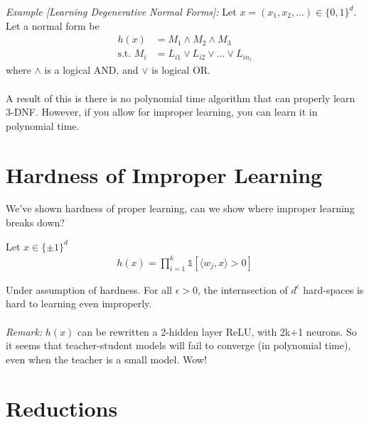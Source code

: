 \begin{sidework}
	\emph{Example [Learning Degenerative Normal Forms]:} Let $x = (x_1, x_2, ...) \in \{0, 1\}^d$. Let a normal form be
\begin{align}
	h(x) & = M_1 \wedge M_2 \wedge M_3\\
	\text{s.t. } M_i & = L_{i1} \vee L_{i2} \vee ... \vee L_{i n_i}
\end{align}
where $\wedge$ is a logical AND, and $\vee$ is logical OR.\\
\\
A result of this is there is no polynomial time algorithm that can properly learn 3-DNF. However, if you allow for improper learning, you can learn it in polynomial time.
\end{sidework}

\section{Hardness of Improper Learning}
We've shown hardness of proper learning, can we show where improper learning breaks down?
\begin{definition}
	 Let $x \in \{\pm 1\}^d$
	\begin{align}
		h(x) = \prod_{i=1}^k \mathds 1[\langle w_j, x\rangle > 0]
	\end{align}
\end{definition}
Under assumption of hardness. For all $\epsilon > 0$, the internsection of $d^\epsilon$ hard-spaces is hard to learning even improperly.\\
\\
\emph{Remark:} $h(x)$ can be rewritten a 2-hidden layer ReLU, with 2k+1 neurons. So it seems that teacher-student models will fail to converge (in polynomial time), even when the teacher is a small model. Wow!


















\section{Reductions}


